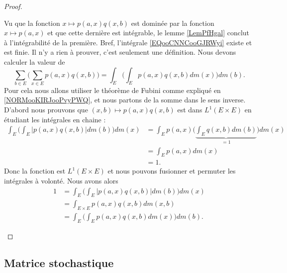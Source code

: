 \begin{proof}
\begin{subproof}
		Vu que la fonction \( x\mapsto p(a,x)q(x,b)\) est dominée par la fonction \( x\mapsto p(a,x)\) et que cette dernière est intégrable, le lemme \ref{LemPfHgal} conclut à l'intégrabilité de la première. Bref, l'intégrale \eqref{EQooCNNCooGJRWyi} existe et est finie.
		Il n'y a rien à prouver, c'est seulement une définition.
		Nous devons calculer la valeur de
		\begin{equation}
			\sum_{b\in E}\big( \sum_{x\in E}p(a,x)q(x,b) \big)=\int_E\big( \int_Ep(a,x)q(x,b)dm(x) \big)dm(b).
		\end{equation}
		Pour cela nous allons utiliser le théorème de Fubini comme expliqué en \ref{NORMooKIRJooPvyPWQ}, et nous partons de la somme dans le sens inverse. D'abord nous prouvons que \( (x,b)\mapsto p(a,x)q(x,b)\) est dans \( L^1(E\times E)\) en étudiant les intégrales en chaine :
		\begin{subequations}
			\begin{align}
				\int_E\Big( \int_E| p(a,x)q(x,b) |dm(b) \Big)dm(x) & =\int_E p(a,x)\Big( \underbrace{\int_Eq(x,b)dm(b)}_{=1} \Big)dm(x) \\
				                                                   & =\int_Ep(a,x)dm(x)                                                 \\
				                                                   & =1.
			\end{align}
		\end{subequations}
		Donc la fonction est \( L^1(E\times E)\) et nous pouvons fusionner et permuter les intégrales à volonté. Nous avons alors
		\begin{subequations}
			\begin{align}
				1 & =\int_E\Big( \int_E| p(a,x)q(x,b) |dm(b) \Big)dm(x) \\
				  & =\int_{E\times E}p(a,x)q(x,b)dm(x,b)                \\
				  & =\int_E\Big( \int_Ep(a,x)q(x,b)dm(x) \Big)dm(b).
			\end{align}
		\end{subequations}
	\end{subproof}
\end{proof}


\subsection{Matrice stochastique}

